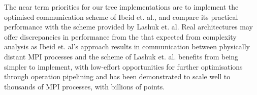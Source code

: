 The near term priorities for our tree implementations are to implement the optimised communication scheme of Ibeid et. al., and compare its practical performance with the scheme provided by Lashuk et. al. Real architectures may offer discrepancies in performance from the that expected from complexity analysis as Ibeid et. al's approach results in communication between physically distant MPI processes and the scheme of Lashuk et. al. benefits from being simpler to implement, with low-effort opportunities for further optimisations through operation pipelining and has been demonstrated to scale well to thousands of MPI processes, with billions of points.
